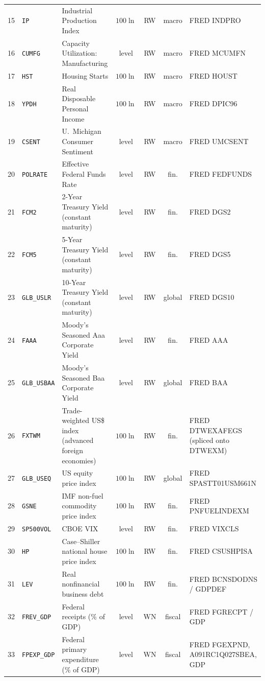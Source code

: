 \documentclass[11pt]{article}
\begin{document}
\begin{small}
\begin{longtable}{r l p{5.9cm} c c c p{3.4cm}}
15 & \texttt{IP} & Industrial Production Index & $100\ln$ & RW & macro & FRED INDPRO \\
16 & \texttt{CUMFG} & Capacity Utilization: Manufacturing & level & RW & macro & FRED MCUMFN \\
17 & \texttt{HST} & Housing Starts & $100\ln$ & RW & macro & FRED HOUST \\
18 & \texttt{YPDH} & Real Disposable Personal Income & $100\ln$ & RW & macro & FRED DPIC96 \\
19 & \texttt{CSENT} & U.\ Michigan Consumer Sentiment & level & RW & macro & FRED UMCSENT \\
20 & \texttt{POLRATE} & Effective Federal Funds Rate & level & RW & fin. & FRED FEDFUNDS \\
21 & \texttt{FCM2} & 2-Year Treasury Yield (constant maturity) & level & RW & fin. & FRED DGS2 \\
22 & \texttt{FCM5} & 5-Year Treasury Yield (constant maturity) & level & RW & fin. & FRED DGS5 \\
23 & \texttt{GLB\_USLR} & 10-Year Treasury Yield (constant maturity) & level & RW & global & FRED DGS10 \\
24 & \texttt{FAAA} & Moody's Seasoned Aaa Corporate Yield & level & RW & fin. & FRED AAA \\
25 & \texttt{GLB\_USBAA} & Moody's Seasoned Baa Corporate Yield & level & RW & global & FRED BAA \\
26 & \texttt{FXTWM} & Trade-weighted US\$ index (advanced foreign economies) & $100\ln$ & RW & fin. & FRED DTWEXAFEGS (spliced onto DTWEXM) \\
27 & \texttt{GLB\_USEQ} & US equity price index & $100\ln$ & RW & global & FRED SPASTT01USM661N \\
28 & \texttt{GSNE} & IMF non-fuel commodity price index & $100\ln$ & RW & fin. & FRED PNFUELINDEXM \\
29 & \texttt{SP500VOL} & CBOE VIX & level & RW & fin. & FRED VIXCLS \\
30 & \texttt{HP} & Case--Shiller national house price index & $100\ln$ & RW & fin. & FRED CSUSHPISA \\
31 & \texttt{LEV} & Real nonfinancial business debt & $100\ln$ & RW & fin. & FRED BCNSDODNS / GDPDEF \\
32 & \texttt{FREV\_GDP} & Federal receipts (\% of GDP) & level & WN & fiscal & FRED FGRECPT / GDP \\
33 & \texttt{FPEXP\_GDP} & Federal primary expenditure (\% of GDP) & level & WN & fiscal & FRED FGEXPND, A091RC1Q027SBEA, GDP \\

\end{longtable}
\end{small}
\end{document}
